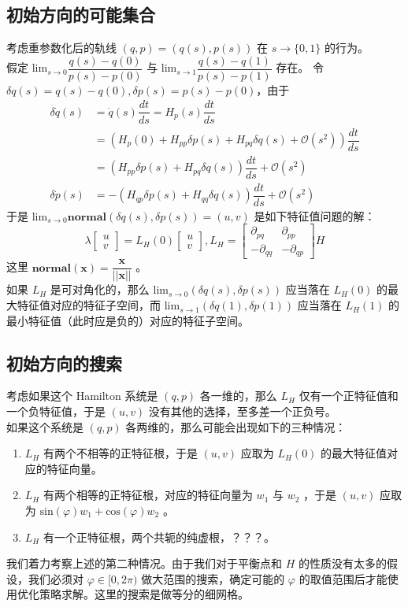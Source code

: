 \documentclass[]{article}
\begin{document}
\subsection{初始方向的可能集合}
考虑重参数化后的轨线 $(q, p) = (q(s), p(s))$ 在 $s \to \{0, 1\}$ 的行为。
\\
假定 $\text{lim}_{s\to 0} \dfrac{q(s) - q(0)}{p(s) - p(0)}$ 与 $\text{lim}_{s\to 1} \dfrac{q(s) - q(1)}{p(s) - p(1)}$ 存在。
令 $\delta q(s) = q(s) - q(0), \delta p(s) = p(s) - p(0)$，由于
\begin{align*}
\delta \dot{q}(s) &= \dot{q}(s) \dfrac{dt}{ds} = H_p(s) \dfrac{dt}{ds} \\
&= \left(H_p(0) + H_{pp} \delta p(s) + H_{pq} \delta q(s) + \mathcal{O}(s^2)\right) \dfrac{dt}{ds} \\
&= \left(H_{pp} \delta p(s) + H_{pq} \delta q(s) \right) \dfrac{dt}{ds} + \mathcal{O}(s^2) \\
\delta \dot{p}(s) &= -\left(H_{qp} \delta p(s) + H_{qq} \delta q(s) \right) \dfrac{dt}{ds} + \mathcal{O}(s^2)
\end{align*}
于是 $\text{lim}_{s\to 0} \textbf{normal}(\delta q(s), \delta p(s)) = (u, v)$ 是如下特征值问题的解：
$$
\lambda \begin{bmatrix} u \\ v \end{bmatrix} = L_H(0) \begin{bmatrix} u \\ v \end{bmatrix} , L_H = \begin{bmatrix} \partial_{pq} & \partial_{pp} \\ -\partial_{qq} & -\partial_{qp} \end{bmatrix} H
$$
这里 $\textbf{normal}(\textbf{x}) = \dfrac{\textbf{x}}{||\textbf{x}||}$ 。
\\
如果 $L_H$ 是可对角化的，那么 $\text{lim}_{s \to 0}(\delta q(s), \delta p(s))$ 应当落在 $L_H(0)$ 的最大特征值对应的特征子空间，而 $\text{lim}_{s \to 1}(\delta q(1), \delta p(1))$ 应当落在 $L_H(1)$ 的最小特征值（此时应是负的）对应的特征子空间。

\subsection{初始方向的搜索}
考虑如果这个 Hamilton 系统是 $(q, p)$ 各一维的，那么 $L_H$ 仅有一个正特征值和一个负特征值，于是 $(u, v)$ 没有其他的选择，至多差一个正负号。
\\
如果这个系统是 $(q, p)$ 各两维的，那么可能会出现如下的三种情况：
\begin{enumerate}
	\item $L_H$ 有两个不相等的正特征根，于是 $(u, v)$ 应取为 $L_H(0)$ 的最大特征值对应的特征向量。
	\item $L_H$ 有两个相等的正特征根，对应的特征向量为 $w_1$ 与 $w_2$ ，于是 $(u, v)$ 应取为 $\text{sin}(\varphi)w_1 + \text{cos}(\varphi)w_2$ 。
	\item $L_H$ 有一个正特征根，两个共轭的纯虚根，？？？。
\end{enumerate}
我们着力考察上述的第二种情况。由于我们对于平衡点和 $H$ 的性质没有太多的假设，我们必须对 $\varphi \in [0, 2\pi)$ 做大范围的搜索，确定可能的 $\varphi$ 的取值范围后才能使用优化策略求解。这里的搜索是做等分的细网格。
\end{document}
